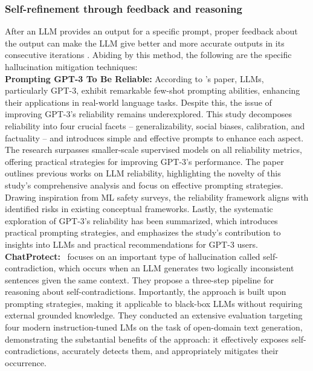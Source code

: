 \documentclass[11pt]{article}
\begin{document}
\subsubsection{Self-refinement through feedback and reasoning}
\label{subsubsec:Self-refinement through feedback and reasoning}
After an LLM provides an output for a specific prompt, proper feedback about the output can make the LLM give better and more accurate outputs in its consecutive iterations \cite{madaan2023selfrefine}. Abiding by this method, the following are the specific hallucination mitigation techniques: \\
\textbf{Prompting GPT-3 To Be Reliable:} According to \cite{si2022prompting}'s paper, LLMs, particularly GPT-3, exhibit remarkable few-shot prompting abilities, enhancing their applications in real-world language tasks. Despite this, the issue of improving GPT-3's reliability remains underexplored. This study decomposes reliability into four crucial facets -- generalizability, social biases, calibration, and factuality -- and introduces simple and effective prompts to enhance each aspect. The research surpasses smaller-scale supervised models on all reliability metrics, offering practical strategies for improving GPT-3's performance. The paper outlines previous works on LLM reliability, highlighting the novelty of this study's comprehensive analysis and focus on effective prompting strategies. Drawing inspiration from ML safety surveys, the reliability framework aligns with identified risks in existing conceptual frameworks. Lastly, the systematic exploration of GPT-3's reliability has been summarized, which introduces practical prompting strategies, and emphasizes the study's contribution to insights into LLMs and practical recommendations for GPT-3 users. \\
\textbf{ChatProtect:}~\cite{mündler2023selfcontradictory} focuses on an important type of
hallucination called self-contradiction, which occurs when an LLM generates two logically inconsistent sentences given the same context.
They propose a three-step pipeline for reasoning about self-contradictions. Importantly, the approach is built upon prompting strategies, making it applicable to black-box LLMs without requiring external grounded knowledge. They conducted an extensive evaluation targeting four modern instruction-tuned LMs on the task of open-domain text generation, demonstrating the substantial benefits of the approach: it effectively exposes self-contradictions, accurately detects them, and appropriately mitigates their occurrence. \\
\end{document}
